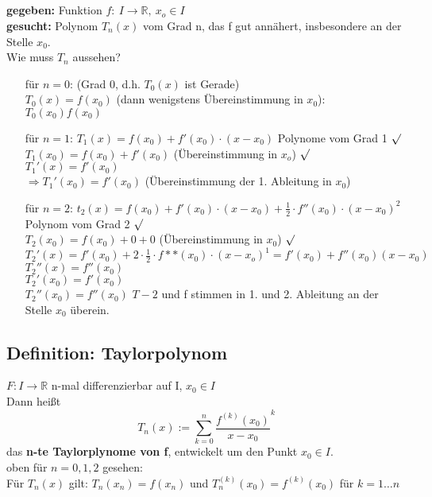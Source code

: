 \subsection*{}
\textbf{gegeben:} Funktion $f: \ I\rightarrow \mathbb{R}, \ x_o\in I$\\
\textbf{gesucht:} Polynom $T_n(x)$ vom Grad n, das f gut annähert, insbesondere an der Stelle $x_0$.\\
Wie muss $T_n$ aussehen?
\begin{enumerate}
	\item[für $n=0$:]
	(Grad 0, d.h. $T_0(x)$ ist Gerade)\\
	$T_0(x)=f(x_0)$ (dann wenigstens Übereinstimmung in $x_0$):\\
	$T_0(x_0)f(x_0)$
	
	\item[für $n=1$:]
	$T_1(x)=f(x_0)+f'(x_0)\cdot (x-x_0)$ Polynome vom Grad 1 $\surd$\\
	$T_1(x_0)=f(x_0)+f'(x_0)$ (Übereinstimmung in $x_o$) $\surd$\\
	$T_1'(x)=f'(x_0)$\\
	$\Rightarrow T_1'(x_0)=f'(x_0)$ (Übereinstimmung der 1. Ableitung in $x_0$)
	
	\item[für $n=2$:]
	$t_2(x)=f(x_0)+f'(x_0)\cdot (x-x_0)+\frac{1}{2}\cdot f''(x_0)\cdot (x-x_0)^2$ Polynom vom Grad 2 $\surd$\\
	$T_2(x_0)=f(x_0)+0+0$ (Übereinstimmung in $x_0$) $\surd$\\
	$T_2'(x)=f'(x_0)+2\cdot \frac{1}{2}\cdot f**(x_0)\cdot (x-x_o)^1=f'(x_0)+f''(x_0)(x-x_0)$\\
	$T_2''(x)=f''(x_0)$\\
	$T_2'(x_0)=f'(x_0)$\\
	$T_2''(x_0)=f''(x_0)$ $T-2$ und f stimmen in 1. und 2. Ableitung an der Stelle $x_0$ überein.
\end{enumerate}

\subsection{Definition: Taylorpolynom}
$F:I\rightarrow \mathbb{R}$ n-mal differenzierbar auf I, $x_0\in I$\\
Dann heißt \[T_n(x):=\sum_{k=0}^n \frac{f^{(k)}(x_0)}{x-x_0}^k\] das \textbf{n-te Taylorplynome von f}, entwickelt um den Punkt $x_0\in I$.\\
oben für $n=0,1,2$ gesehen:\\
Für $T_n(x)$ gilt: $T_n(x_n)=f(x_n)$ und $T_n^{(k)}(x_0)=f^{(k)}(x_0)$ für $k=1\dots n$


